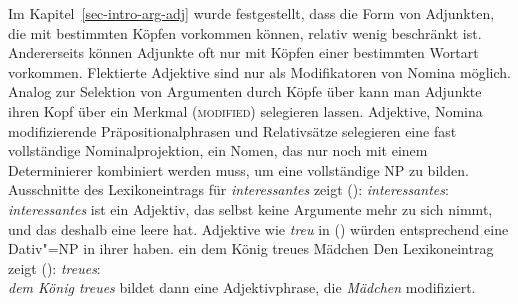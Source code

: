 Im Kapitel~\ref{sec-intro-arg-adj} wurde festgestellt, dass die Form von Adjunkten,
die mit bestimmten Köpfen vorkommen können, relativ wenig beschränkt ist. Andererseits
können Adjunkte oft nur mit Köpfen einer bestimmten Wortart vorkommen. Flektierte
Adjektive sind \zb nur als Modifikatoren von Nomina möglich. 
\eal
{}
\zl
Analog zur Selektion von Argumenten durch Köpfe über \subcat kann
man Adjunkte ihren Kopf über ein Merkmal (\textsc{modified}) selegieren lassen.
Adjektive, Nomina modifizierende Präpositionalphrasen und Relativsätze
selegieren eine fast vollständige Nominalprojektion, \dash ein Nomen, das
nur noch mit einem Determinierer kombiniert werden muss, um eine vollständige
NP zu bilden. Ausschnitte des Lexikoneintrags für \emph{interessantes} zeigt ():
\ea{}
\label{le-interessantes}
\emph{interessantes}:\\
\z
\emph{interessantes} ist ein Adjektiv, das selbst keine Argumente mehr zu sich nimmt,
und das deshalb eine leere \subcatl hat. Adjektive wie \emph{treu} in () würden entsprechend
eine Dativ"=NP in ihrer \subcatl haben.
\ea
ein dem König treues Mädchen
\z
Den Lexikoneintrag zeigt ():
\ea
\label{le-treue}
\emph{treues}:\\
\z
\emph{dem König treues} bildet dann eine Adjektivphrase, die \emph{Mädchen} modifiziert.

